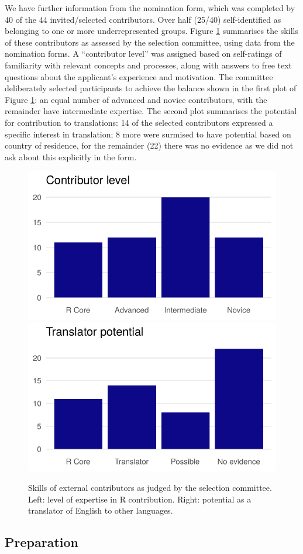 We have further information from the nomination form, which was completed by 40 of the 44 invited/selected contributors. Over half (25/40) self-identified as belonging to one or more underrepresented groups. Figure \ref{fig:skills} summarises the skills of these contributors as assessed by the selection committee, using data from the nomination forms. A ``contributor level'' was assigned based on self-ratings of familiarity with relevant concepts and processes, along with answers to free text questions about the applicant's experience and motivation.
The committee deliberately selected participants to achieve the balance shown in
the first plot of Figure \ref{fig:skills}: an equal number of advanced and
novice contributors, with the remainder have intermediate expertise. The second
plot summarises the potential for contribution to translations: 14 of
the selected contributors expressed a specific interest in translation; 8 more
were surmised to have potential based on country of residence, for the
remainder (22) there was no evidence as we did not ask about this explicitly in the form.

\begin{figure}
\includegraphics[width=0.5\linewidth]{figures/contributor_level} \includegraphics[width=0.5\linewidth]{figures/translator_level} \caption{Skills of external contributors as judged by the selection committee. Left: level of expertise in R contribution. Right: potential as a translator of English to other languages.}\label{fig:skills}
\end{figure}

\hypertarget{preparation}{%
\subsection{Preparation}\label{preparation}}

